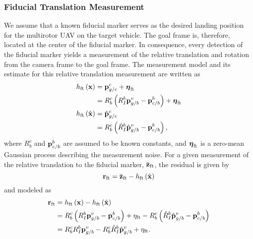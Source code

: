 \subsubsection{Fiducial Translation Measurement}
We assume that a known fiducial marker serves as the desired landing position
for the multirotor UAV on the target vehicle. The goal frame is, therefore,
located at the center of the fiducial marker. In consequence, every detection of the fiducial
marker yields a measurement of the relative translation and rotation from the
camera frame to the goal frame.
The measurement model and its estimate for this relative translation measurement
are written as
\begin{align}
  h_{\text{ft}} \left( \boldsymbol{\mathrm{x}} \right) &=
  \boldsymbol{\mathrm{p}}_{g/c}^c + \boldsymbol{\mathrm{\eta}}_{\text{ft}} \\
  &= R_b^c \left( R_I^b \boldsymbol{\mathrm{p}}_{g/b}^v -
  \boldsymbol{\mathrm{p}}_{c/b}^b \right) + \boldsymbol{\mathrm{\eta}}_{\text{ft}} \\
  h_{\text{ft}} \left( \hat{\boldsymbol{\mathrm{x}}} \right) &=
    \hat{\boldsymbol{\mathrm{p}}}_{g/c}^c \\
  &= R_b^c \left( \hat{R}_I^b \hat{\boldsymbol{\mathrm{p}}}_{g/b}^v -
    \boldsymbol{\mathrm{p}}_{c/b}^b \right),
\end{align}
where $R_b^c$ and $\boldsymbol{\mathrm{p}}_{c/b}^b$ are assumed to be known constants, and
$\boldsymbol{\mathrm{\eta}}_{\text{ft}}$ is a zero-mean Gaussian process describing the
measurement noise.
For a given measurement of the relative translation to the fiducial marker,
$\bar{\boldsymbol{\mathrm{z}}}_{\text{ft}}$, the residual is given by
\begin{equation}
  \boldsymbol{\mathrm{r}}_{\text{ft}} = \bar{\boldsymbol{\mathrm{z}}}_{\text{ft}} - h_{\text{ft}} \left( \hat{\boldsymbol{\mathrm{x}}}
  \right)
\end{equation}
and modeled as
\begin{align}
  \boldsymbol{\mathrm{r}}_{\text{ft}} &=  h_{\text{ft}} \left( \boldsymbol{\mathrm{x}} \right) - h_{\text{ft}} \left( \hat{\boldsymbol{\mathrm{x}}}
  \right) \\
                       &= R_b^c \left( R_I^b \boldsymbol{\mathrm{p}}_{g/b}^v -
                         \boldsymbol{\mathrm{p}}_{c/b}^b \right)  +\eta_{\text{ft}} - R_b^c \left( \hat{R}_I^b \hat{\boldsymbol{\mathrm{p}}}_{g/b}^v -
    \boldsymbol{\mathrm{p}}_{c/b}^b \right)  \\
                       &= R_b^c R_I^b \boldsymbol{\mathrm{p}}_{g/b}^v 
                          - R_b^c \hat{R}_I^b \hat{\boldsymbol{\mathrm{p}}}_{g/b}^v +
                          \eta_{\text{ft}}.
                          \label{eq:rft_1}
\end{align}
